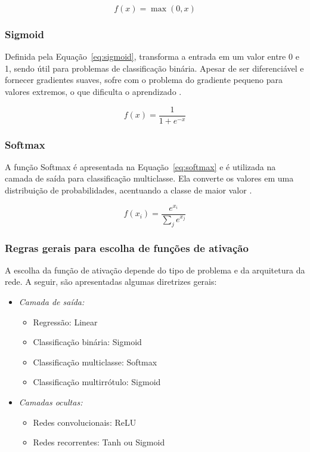 \begin{equation}
    f(x) = \max(0, x)
    \label{eq:relu}
\end{equation}

\subsubsection{Sigmoid}

Definida pela Equação~\ref{eq:sigmoid}, transforma a entrada em um valor entre 0 e 1, sendo útil para problemas de classificação binária. Apesar de ser diferenciável e fornecer gradientes suaves, sofre com o problema do gradiente pequeno para valores extremos, o que dificulta o aprendizado \cite{langer2020approximating}.

\begin{equation}
    f(x) = \frac{1}{1 + e^{-x}}
    \label{eq:sigmoid}
\end{equation}

\subsubsection{Softmax}
A função Softmax é apresentada na Equação~\ref{eq:softmax} e é utilizada na camada de saída para classificação multiclasse. Ela converte os valores em uma distribuição de probabilidades, acentuando a classe de maior valor \cite{gao2017properties}.


\begin{equation}
    f(x_i) = \frac{e^{x_i}}{\sum_j e^{x_j}}
    \label{eq:softmax}
\end{equation}

\subsubsection{Regras gerais para escolha de funções de ativação}

A escolha da função de ativação depende do tipo de problema e da arquitetura da rede. A seguir, são apresentadas algumas diretrizes gerais:

\begin{itemize}
    \item \textit{Camada de saída:}
    \begin{itemize}
        \item Regressão: Linear
        \item Classificação binária: Sigmoid
        \item Classificação multiclasse: Softmax
        \item Classificação multirrótulo: Sigmoid
    \end{itemize}
    \item \textit{Camadas ocultas:}
    \begin{itemize}
        \item Redes convolucionais: ReLU
        \item Redes recorrentes: Tanh ou Sigmoid
    \end{itemize}
\end{itemize}

